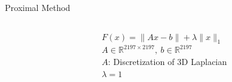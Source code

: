 \documentclass[10pt]{beamer}
\begin{document}
\begin{frame}{Proximal Method}
\begin{columns}[T]
\begin{column}{.5\textwidth}
\begin{center}
{\begin{tabular}{|c|c|c|c|}
   					\end{tabular}
   				}
   			\end{center}
   		\pause
   		\end{column}\hfill
   		\begin{column}{.5\textwidth}
   			$F(x) = \lVert Ax - b \rVert + \lambda \lVert x \rVert_1$\\
   			$A \in \mathbb{R}^{2197 \times 2197},\:b \in \mathbb{R}^{2197}$\\
   			$A$: \small Discretization of 3D Laplacian\\
   			\normalsize$\lambda = 1$\\
   			\vspace{8pt}
   			\resizebox{\linewidth}{!}{}
   			\begin{center}
   				\hspace{5pt}
   			\end{center}
   		\end{column}
   	\end{columns}
   \end{frame}
   
\end{document}
